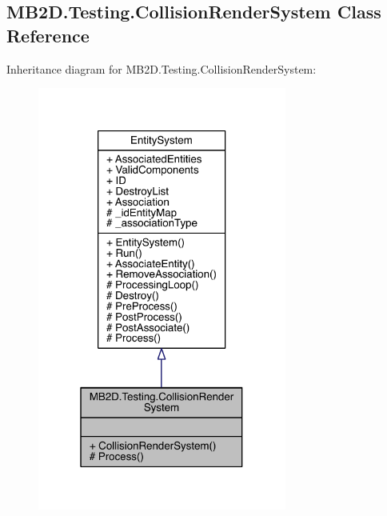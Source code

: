 \hypertarget{class_m_b2_d_1_1_testing_1_1_collision_render_system}{}\subsection{M\+B2\+D.\+Testing.\+Collision\+Render\+System Class Reference}
\label{class_m_b2_d_1_1_testing_1_1_collision_render_system}


Inheritance diagram for M\+B2\+D.\+Testing.\+Collision\+Render\+System\+:
\nopagebreak
\begin{figure}[H]
\begin{center}
\leavevmode
\includegraphics[width=232pt]{class_m_b2_d_1_1_testing_1_1_collision_render_system__inherit__graph}
\end{center}
\end{figure}


